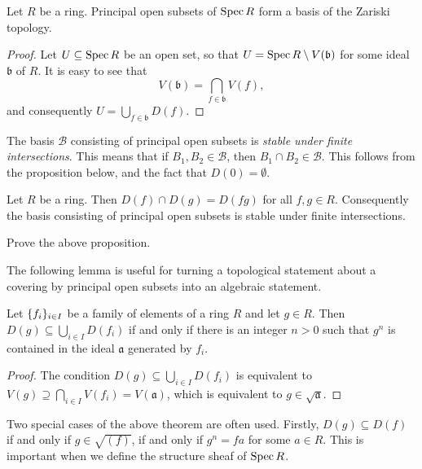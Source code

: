 \begin{proposition}
	Let $R$ be a ring.	Principal open subsets of $\operatorname{Spec} R$ form a basis of the Zariski topology.
\end{proposition}
\begin{proof}
	Let $U \subseteq \operatorname{Spec} R$ be an open set, so that $U = \operatorname{Spec} R \setminus V(\mathfrak{b})$ for some ideal $\mathfrak{b}$ of $R$. It is easy to see that
	\begin{equation*}
		V(\mathfrak{b}) = \bigcap_{f \in \mathfrak{b}} V(f),
	\end{equation*}
	and consequently $U = \bigcup_{f \in \mathfrak{b}} D(f)$.
\end{proof}

The basis $\mathcal{B}$ consisting of principal open subsets is \textit{stable under finite intersections}. This means that if $B_1, B_2 \in \mathcal{B}$, then $B_1 \cap B_2 \in \mathcal{B}$. This follows from the proposition below, and the fact that $D(0) = \emptyset$.

\begin{proposition}\label{chap2:principal-open-is-basis}
	Let $R$ be a ring. Then $D(f) \cap D(g) = D(fg)$ for all $f, g\in R$. Consequently the basis consisting of principal open subsets is stable under finite intersections.
\end{proposition}
\begin{exercise}
	Prove the above proposition.
\end{exercise}

The following lemma is useful for turning a topological statement about a covering by principal open subsets into an algebraic statement.

\begin{lemma}\label{chap2:covering-trick}
	Let $\lbrace f_i\rbrace_{i \in I}$ be a family of elements of a ring $R$ and let $g \in R$. Then $D(g) \subseteq \bigcup_{i \in I}D(f_i)$ if and only if there is an integer $n >0$ such that $g^n$ is contained in the ideal $\mathfrak{a}$ generated by $f_i$.
\end{lemma}
\begin{proof}
	The condition $D(g) \subseteq \bigcup_{i \in I}D(f_i)$ is equivalent to $V(g) \supseteq \bigcap_{i \in I} V(f_i) = V(\mathfrak{a})$, which is equivalent to $g \in \sqrt{\mathfrak{a}}$.
\end{proof}

Two special cases of the above theorem are often used. Firstly, $D(g) \subseteq D(f)$ if and only if $g \in \sqrt{(f)}$, if and only if $g^n = fa$ for some $a \in R$. This is important when we define the structure sheaf of $\operatorname{Spec} R$. 

